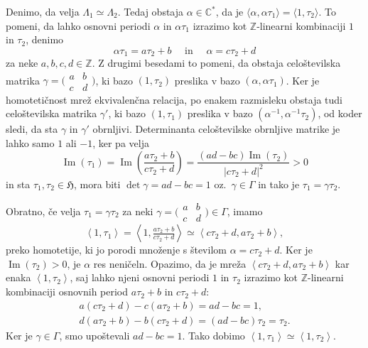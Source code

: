 \documentclass[mat1]{fmfdelo}
\numberwithin{equation}{section}
\newcommand{\Z}{\mathbb Z}
\newcommand{\HH}{\mathfrak{H}}
\newcommand{\CM}{\mathbb C ^*}
\newcommand{\inv}{^{-1}}
\newcommand{\SL}{\Gamma}
\newcommand{\abcd}{\big(\begin{smallmatrix} a & b\\c & d \end{smallmatrix}\big)}
\newcommand{\htp}{\simeq}
\newcommand{\abs}[1]{\left\lvert #1 \right\rvert}
\newcommand{\lattice}[2]{\left\langle #1, #2 \right\rangle}
\renewcommand\Im{\operatorname{Im}}%
\newcommand{\oz}{oz.\ }
\theoremstyle{definition}
\begin{document}
\begin{dokaz}
    Denimo, da velja $\Lambda_1 \htp \Lambda_2$. Tedaj obstaja $\alpha \in \CM$, da je $\langle \alpha, \alpha\tau_1 \rangle = \langle 1, \tau_2 \rangle$. To pomeni, da lahko osnovni periodi $\alpha$ in $\alpha\tau_1$ izrazimo kot $\Z$-linearni kombinaciji $1$ in $\tau_2$, denimo 
    \[
        \alpha\tau_1 = a\tau_2 + b \quad \text{ in } \quad \alpha = c\tau_2 + d  
    \]
    za neke $a, b, c, d \in \Z$. Z drugimi besedami to pomeni, da obstaja celoštevilska matrika $\gamma = \abcd$, ki bazo $(1,\tau_2)$ preslika v bazo $(\alpha, \alpha\tau_1)$. Ker je homotetičnost mrež ekvivalenčna relacija, po enakem razmisleku obstaja tudi celoštevilska matrika $\gamma'$, ki bazo $(1, \tau_1)$ preslika v bazo $(\alpha\inv, \alpha\inv\tau_2)$, od koder sledi, da sta $\gamma$ in $\gamma'$ obrnljivi. Determinanta celoštevilske obrnljive matrike je lahko samo $1$ ali $-1$, ker pa velja 
    \[
        \Im(\tau_1) = 
        \Im\left(\frac{a\tau_2 + b}{c\tau_2 + d}\right) = 
        \frac{(ad - bc)\Im(\tau_2)}{\abs{c\tau_2 + d}^2} > 0
    \]
    in sta $\tau_1, \tau_2 \in \HH$, mora biti $\det\gamma = ad - bc = 1$ \oz $\gamma \in \SL$ in tako je $\tau_1 = \gamma\tau_2$.
    

    Obratno, če velja $\tau_1 = \gamma\tau_2$ za neki $\gamma = \abcd \in \SL$, imamo
    \[
        \lattice{1}{\tau_1} = 
        \lattice{1}{\tfrac{a\tau_2 + b}{c\tau_2 + d}} \htp
        \lattice{c\tau_2 + d}{a\tau_2 + b},
    \]
    preko homotetije, ki jo porodi množenje s številom $\alpha = c\tau_2 + d$. Ker je $\Im(\tau_2) > 0$, je $\alpha$ res neničeln. Opazimo, da je mreža $\lattice{c\tau_2 + d}{a\tau_2 + b}$ kar enaka $\lattice{1}{\tau_2}$, saj lahko njeni osnovni periodi $1$ in $\tau_2$ izrazimo kot $\Z$-linearni kombinaciji osnovnih period $a\tau_2 + b$ in $c\tau_2 + d$:
    \begin{gather*}
        a(c\tau_2 + d) - c(a\tau_2 + b) = ad - bc = 1, \\
        d(a\tau_2 + b) - b(c\tau_2 + d) = (ad - bc)\tau_2 = \tau_2.
    \end{gather*}
    Ker je $\gamma \in \SL$, smo upoštevali $ad - bc = 1$. Tako dobimo $\lattice{1}{\tau_1} \htp \lattice{1}{\tau_2}$.
\end{dokaz}
\end{document}
